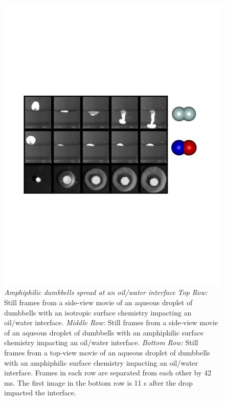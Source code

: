 \begin{figure}[htbp]
\centering
\includegraphics[width=1\textwidth]{figures/dumbbellinterface1.pdf}
\caption{\label{fig:NDBinterface1} \emph{Amphiphilic dumbbells spread at an oil/water interface}
\emph{Top Row:} Still frames from a side-view movie of an aqueous droplet of dumbbells with an isotropic surface chemistry impacting an oil/water interface.
\emph{Middle Row:} Still frames from a side-view movie of an aqueous droplet of dumbbells with an amphiphilic surface chemistry impacting an oil/water interface.
\emph{Bottom Row:} Still frames from a top-view movie of an aqueous droplet of dumbbells with an amphiphilic surface chemistry impacting an oil/water interface.
Frames in each row are separated from each other by 42 ms. The first image in the bottom row is 11 s after the drop impacted the interface.}
\end{figure}


